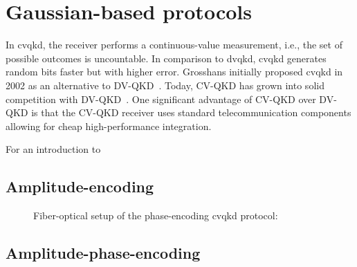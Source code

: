 \section{Gaussian-based protocols}

In \gls{cvqkd}, the receiver performs a continuous-value measurement, i.e., the set of possible outcomes is uncountable.
In comparison to \gls{dvqkd}, \gls{cvqkd} generates random bits faster but with higher error.
Grosshans initially proposed \gls{cvqkd} in 2002 as an alternative to DV-QKD~\cite{Grosshans2002}.
Today, CV-QKD has grown into solid competition with DV-QKD~\cite{Diamanti2016}.
One significant advantage of CV-QKD over DV-QKD is that the CV-QKD receiver uses standard telecommunication components allowing for cheap high-performance integration.

For an introduction to 



\subsection{Amplitude-encoding}

\begin{figure}[htb]
	\centering
	
	\caption{Fiber-optical setup of the phase-encoding \gls{cvqkd} protocol:}
\end{figure}

\subsection{Amplitude-phase-encoding}

